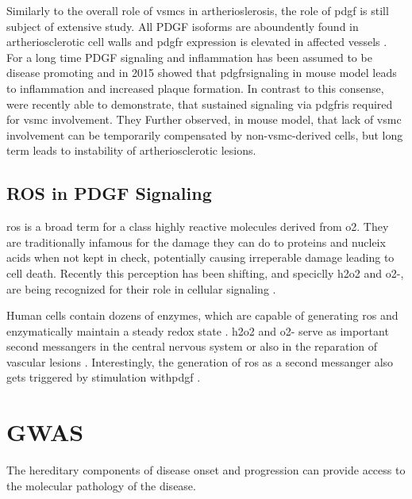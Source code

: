     Similarly to the overall role of \acp{vsmc} in artherioslerosis, the role of \ac{pdgf} is still subject of extensive study. All PDGF isoforms are aboundently found in artheriosclerotic cell walls and \ac{pdgfr} expression is elevated in affected vessels \cite{huTargetingPlateletderivedGrowth2015}. For a long time PDGF signaling and inflammation has been assumed to be disease promoting \cite{andraeRolePlateletderivedGrowth2008, chenPlateletderivedGrowthFactors2013, hePDGFRvSignallingRegulates2015, huTargetingPlateletderivedGrowth2015} and in 2015 \textcite{hePDGFRvSignallingRegulates2015} showed that \ac{pdgfr}\beta signaling in mouse model leads to inflammation and increased plaque formation. In contrast to this consense, \textcite{newmanMultipleCellTypes2021} were recently able to demonstrate, that sustained signaling via \ac{pdgfr}\beta is required for \ac{vsmc} involvement. They Further observed, in mouse model, that lack of \ac{vsmc} involvement can be temporarily compensated by non-\ac{vsmc}-derived cells, but long term leads to instability of artheriosclerotic lesions.

    \subsection{ROS in PDGF Signaling}
    \label{subsec:ROS_signaling}
    \ac{ros} is a broad term for a class highly reactive molecules derived from \ac{o2}. They are traditionally infamous for the damage they can do to proteins and nucleix acids when not kept in check, potentially causing irreperable damage leading to cell death. Recently this perception has been shifting, and speciclly \ac{h2o2} and \ac{o2-}, are being recognized for their role in cellular signaling \cite{siesReactiveOxygenSpecies2020}.

    Human cells contain dozens of enzymes, which are capable of generating \ac{ros} and enzymatically maintain a steady redox state \cite{siesReactiveOxygenSpecies2020}. \ac{h2o2} and \ac{o2-} serve as important second messangers in the central nervous system \cite{nayerniaNewInsightsNOX2014} or also in the reparation of vascular lesions \cite{andraeRolePlateletderivedGrowth2008}. Interestingly, the generation of \ac{ros} as a second messanger also gets triggered by stimulation with\ac{pdgf} \cite{sundaresanRequirementGenerationH2O21995, bouziguesRegulationROSResponse2014a}.


\section{GWAS}
\label{sec:gwas}
The hereditary components of disease onset and progression can provide access to the molecular pathology of the disease.

